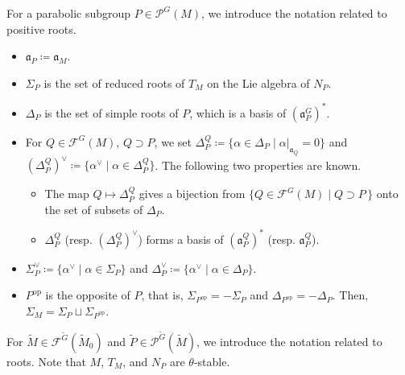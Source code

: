 \documentclass[12pt]{amsart}
\theoremstyle{definition}
\theoremstyle{plain}
\theoremstyle{remark}
\newcommand{\fa}{\mathfrak{a}}
\newcommand{\cF}{\mathcal{F}}
\newcommand{\cP}{\mathcal{P}}
\numberwithin{equation}{section}
\newcommand{\tG}{\widetilde{G}}
\newcommand{\tM}{\widetilde{M}}
\newcommand{\tP}{\widetilde{P}}
\newcommand{\op}{\mathrm{op}}
\begin{document}
For a parabolic subgroup $P\in\cP^G(M)$, we introduce the notation related to positive roots.
\begin{itemize}
    \item $\fa_P\coloneqq\fa_M$. 
    \item $\Sigma_P$ is the set of reduced roots of $T_M$ on the Lie algebra of $N_P$.
    \item $\Delta_P$ is the set of simple roots of $P$, which is a basis of $(\fa_P^G)^*$. 
    \item For $Q\in\cF^G(M)$, $Q\supset P$, we set $\Delta_P^Q\coloneqq \{ \alpha\in \Delta_P \mid \alpha|_{\fa_Q}=0   \}$ and $(\Delta_P^Q)^\vee\coloneqq\{ \alpha^\vee \mid \alpha\in\Delta_P^Q\}$. 
    The following two properties are known.
    \begin{itemize}
        \item The map $Q \longmapsto \Delta_{P}^{Q}$ gives a bijection from $\{ Q\in \cF^G(M) \mid Q \supset P \,\}$ onto the set of subsets of $\Delta_{P}$.
        \item $\Delta_{P}^{Q}$ (resp. $(\Delta_{P}^{Q})^\vee$) forms a basis of $(\fa_{P}^{Q})^*$ (resp. $\fa_{P}^{Q}$).
    \end{itemize}
    \item $\Sigma_P^\vee\coloneqq\{ \alpha^\vee \mid \alpha\in\Sigma_P\}$ and $\Delta_P^\vee\coloneqq\{ \alpha^\vee \mid \alpha\in\Delta_P\}$. 
    \item $P^\op$ is the opposite of $P$, that is, $\Sigma_{P^\op}=-\Sigma_P$ and $\Delta_{P^\op}=-\Delta_P$. Then, $\Sigma_M=\Sigma_P\sqcup\Sigma_{P^\op}$.
\end{itemize}
For $\tM\in\cF^{\tG}(\tM_0)$ and $\tP\in\cP^{\tG}(\tM)$, 
we introduce the notation related to roots.
Note that $M$, $T_M$, and $N_P$ are $\theta$-stable. 
\end{document}
